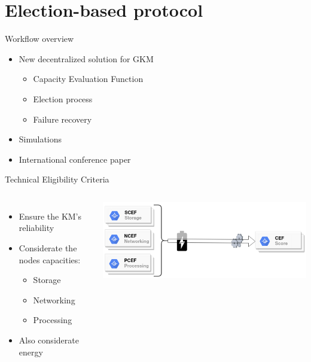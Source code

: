 \documentclass{beamer}
\begin{document}
\section{Election-based protocol}

\begin{frame}{Workflow overview}
	\begin{itemize}
		\item New decentralized solution for GKM
		\begin{itemize}
			\item Capacity Evaluation Function
			\item Election process
			\item Failure recovery
		\end{itemize}
		\item Simulations
		\item International conference paper
	\end{itemize}
\end{frame}

\begin{frame}{Technical Eligibility Criteria}
	\begin{columns}
		\begin{itemize}
			\item Ensure the KM's reliability
			\item Considerate the nodes capacities:
			\begin{itemize}
				\item Storage
				\item Networking
				\item Processing
			\end{itemize}
			\item Also considerate energy
		\end{itemize}
		\includegraphics[width=\linewidth]{figures/cef_simple2.png}
	\end{columns}
\end{frame}
\end{document}
